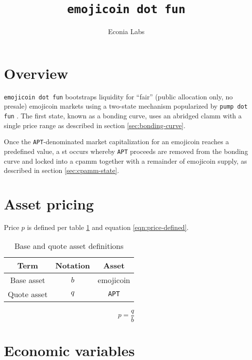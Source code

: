 \documentclass[table, twocolumn]{article}
\title{\texttt{emojicoin dot fun}}
\author{Econia Labs}
\date{}
\begin{document}
\maketitle

\section{Overview}

\texttt{emojicoin dot fun} bootstraps liquidity for ``fair'' (public allocation only, no
presale) emojicoin \cite{emojicoin} markets using a two-state mechanism popularized
by \texttt{pump dot fun} \cite{pump}. The first state, known as a bonding curve, uses an
abridged \gls*{clamm} with a single price range \cite{univ3} as described in section
\ref{sec:bonding-curve}.

Once the \texttt{APT}-denominated \cite{octa} market capitalization for an emojicoin
reaches a predefined value, a \gls*{st} occurs whereby \texttt{APT} proceeds
are removed from the bonding curve and locked into a \gls*{cpamm} \cite{univ2} together
with a remainder of emojicoin supply, as described in section \ref{sec:cpamm-state}.

\section{Asset pricing}

Price $p$ is defined per table \ref{tab:b-q-definitions} and equation
\ref{eqn:price-defined}.

\begin{table}[!htb]
  \centering
  \begin{tabular}{|c|c|c|}
    \hline \rowcolor{blue}
    Term        & Notation & Asset        \\ \hline
    Base asset  & $b$      & emojicoin    \\ \hline
    Quote asset & $q$      & \texttt{APT} \\ \hline
  \end{tabular}
  \caption{Base and quote asset definitions}
  \label{tab:b-q-definitions}
\end{table}

\begin{equation} \label{eqn:price-defined}
  p = \frac{q}{b}
\end{equation}

\section{Economic variables}
\end{document}
